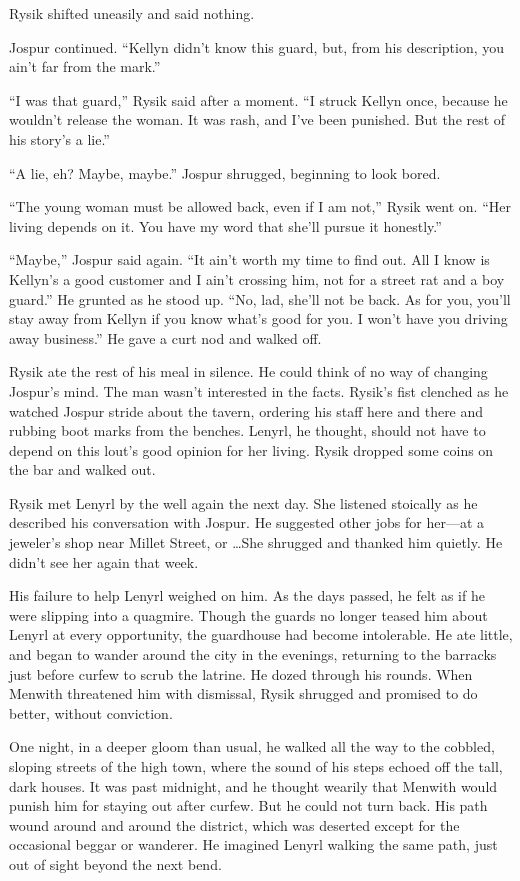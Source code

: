 \documentclass[10pt,b5paper]{article}
\begin{document}
Rysik shifted uneasily and said nothing.

Jospur continued. ``Kellyn didn't know this guard, but, from his
description, you ain't far from the mark.''

``I was that guard,'' Rysik said after a moment. ``I struck Kellyn once,
because he wouldn't release the woman. It was rash, and I've been
punished. But the rest of his story's a lie.''

``A lie, eh? Maybe, maybe.'' Jospur shrugged, beginning to look bored.

``The young woman must be allowed back, even if I am not,'' Rysik
went on. ``Her living depends on it. You have my word that she'll
pursue it honestly.''

``Maybe,'' Jospur said again. ``It ain't worth my time to find out. All
I know is Kellyn's a good customer and I ain't crossing him, not for
a street rat and a boy guard.'' He grunted as he stood up. ``No, lad,
she'll not be back. As for you, you'll stay away from Kellyn if you
know what's good for you. I won't have you driving away business.''
He gave a curt nod and walked off.

Rysik ate the rest of his meal in silence. He could think of no way
of changing Jospur's mind. The man wasn't interested in the facts.
Rysik's fist clenched as he watched Jospur stride about the tavern,
ordering his staff here and there and rubbing boot marks from the
benches. Lenyrl, he thought, should not have to depend on this
lout's good opinion for her living. Rysik dropped some coins on
the bar and walked out.

\bigskip

Rysik met Lenyrl by the well again the next day. She listened
stoically as he described his conversation with Jospur. He suggested
other jobs for her---at a jeweler's shop near Millet Street, or
\ldots\@ She
shrugged and thanked him quietly. He didn't see her again that week.

His failure to help Lenyrl weighed on him. As the days passed, he
felt as if he were slipping into a quagmire. Though the guards no
longer teased him about Lenyrl at every opportunity, the guardhouse
had become intolerable. He ate little, and began to wander around
the city in the evenings, returning to the barracks just before
curfew to scrub the latrine. He dozed through his rounds. When
Menwith threatened him with dismissal, Rysik shrugged and promised
to do better, without conviction.

One night, in a deeper gloom than usual, he walked all the way to
the cobbled, sloping streets of the high town, where the sound of
his steps echoed off the tall, dark houses. It was past midnight,
and he thought wearily that Menwith would punish him for staying out
after curfew. But he could not turn back. His path wound around and
around the district, which was deserted except for the occasional
beggar or wanderer. He imagined Lenyrl walking the same path,
just out of sight beyond the next bend.
\end{document}
